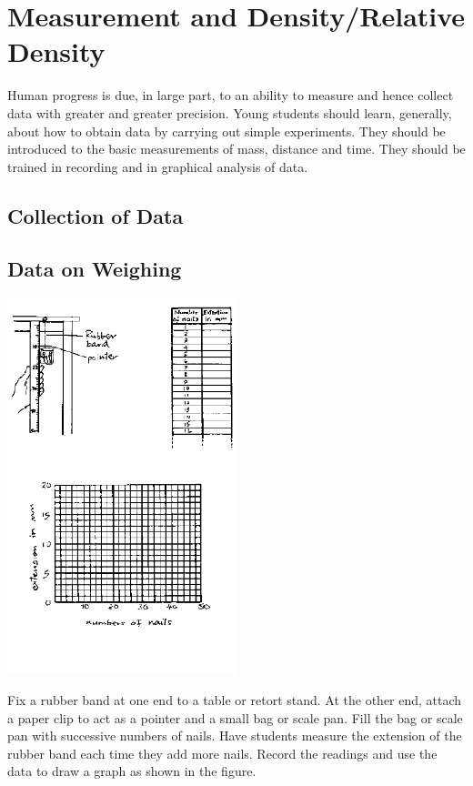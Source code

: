 \section{Measurement and Density/Relative Density} 

Human progress is due, in large part, to an ability to measure and hence collect data with
greater and greater precision. Young students should learn, generally, about how to obtain data
by carrying out simple experiments. They should be introduced to the basic measurements of
mass, distance and time. They should be trained in recording and in graphical analysis of
data.

\begin{multicols}{2}

\section*{Collection of Data} 


\subsection{Data on Weighing} 

\begin{center}
\includegraphics[width=0.5\textwidth]{./img/source/meas-mass.png}
\end{center}

Fix a rubber band at one end to a table or retort stand. At the other end, attach a paper clip to act as a pointer and a small bag or scale pan. Fill the bag or scale pan with successive numbers of nails. Have students measure the extension of the rubber band each time they add more nails. Record the readings and use the data to draw a graph as shown in the figure.


\end{multicols}
